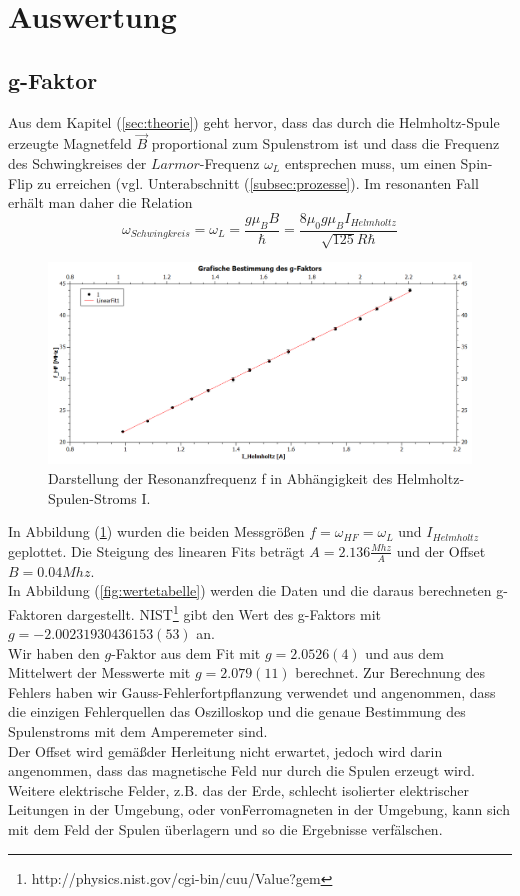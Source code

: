 \documentclass[a4paper,10pt]{scrartcl} %
\begin{document}
\section{Auswertung}
\label{sec:auswertung}
\subsection{g-Faktor}
\label{subsec:g-Faktor}
Aus dem Kapitel (\ref{sec:theorie}) geht hervor, dass das durch die Helmholtz-Spule erzeugte Magnetfeld $\vec{B}$ proportional zum Spulenstrom ist und dass die Frequenz des Schwingkreises der $Larmor$-Frequenz $\omega _L$ entsprechen muss, um einen Spin-Flip zu erreichen (vgl. Unterabschnitt (\ref{subsec:prozesse}). Im resonanten Fall erhält man daher die Relation
\begin{equation}
\label{eqn:Auswertung-g-faktor}
\omega _{Schwingkreis} = \omega _L = \frac{g \mu _B B}{\hbar} =  \frac{8 \mu _0 g \mu _B I_{Helmholtz}}{\sqrt{125} R \hbar}
\end{equation}
\begin{figure}
\label{fig:g-faktor-slope}
\includegraphics[width=\textwidth]{Daten/g-faktor.png}
\caption{Darstellung der Resonanzfrequenz f in Abhängigkeit des Helmholtz-Spulen-Stroms I.}
\end{figure}
In Abbildung (\ref{fig:g-faktor-slope}) wurden die beiden Messgrö\ss en $f = \omega _{HF} = \omega _L$ und $I_{Helmholtz}$ geplottet. Die Steigung des linearen Fits beträgt $A = 2.136 \frac{Mhz}{A}$ und der Offset $B = 0.04 Mhz$.\\
In Abbildung (\ref{fig:wertetabelle}) werden die Daten und die daraus berechneten g-Faktoren dargestellt. NIST\footnote{http://physics.nist.gov/cgi-bin/cuu/Value?gem} gibt den Wert des g-Faktors mit $g = -2.002 319 304 361 53(53)$ an.\\
Wir haben den $g$-Faktor aus dem Fit mit $g = 2.0526(4)$ und aus dem Mittelwert der Messwerte mit $g = 2.079(11)$ berechnet. Zur Berechnung des Fehlers haben wir Gauss-Fehlerfortpflanzung verwendet und angenommen, dass die einzigen Fehlerquellen das Oszilloskop und die genaue Bestimmung des Spulenstroms mit dem Amperemeter sind.\\
Der Offset wird gemä\ss der Herleitung nicht erwartet, jedoch wird darin angenommen, dass das magnetische Feld nur durch die Spulen erzeugt wird. Weitere elektrische Felder, z.B. das der Erde, schlecht isolierter elektrischer Leitungen in der Umgebung, oder vonFerromagneten in der Umgebung, kann sich mit dem Feld der Spulen überlagern und so die Ergebnisse verfälschen.
\end{document}
